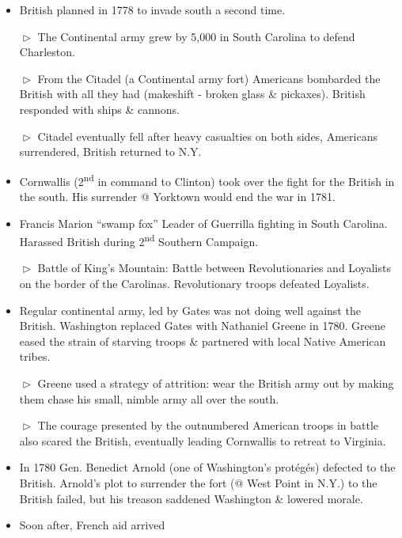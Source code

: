 \documentclass[10pt]{article}
\begin{document}
\begin{flushleft}

\begin{multicols}{2}

\begin{itemize}
\item British planned in 1778 to invade south a second time.
\item[$\vartriangleright$] The Continental army grew by 5,000 in South Carolina to defend Charleston.
\item[$\vartriangleright$] From the Citadel (a Continental army fort) Americans bombarded the British with all they had (makeshift - broken glass \& pickaxes). British responded with ships \& cannons.
\item[$\vartriangleright$] Citadel eventually fell after heavy casualties on both sides, Americans surrendered, British returned to N.Y.
\item Cornwallis (2\textsuperscript{nd} in command to Clinton) took over the fight for the British in the south. His surrender @ Yorktown would end the war in 1781.
\item Francis Marion ``swamp fox'' Leader of Guerrilla fighting in South Carolina. Harassed British during 2\textsuperscript{nd} Southern Campaign. 
\item[$\vartriangleright$] Battle of King's Mountain: Battle between Revolutionaries and Loyalists on the border of the Carolinas. Revolutionary troops defeated Loyalists.
\item Regular continental army, led by Gates was not doing well against the British. Washington replaced Gates with Nathaniel Greene in 1780. Greene eased the strain of starving troops \& partnered with local Native American tribes. 
\item[$\vartriangleright$] Greene used a strategy of attrition: wear the British army out by making them chase his small, nimble army all over the south.
\item[$\vartriangleright$] The courage presented by the outnumbered American troops in battle also scared the British, eventually leading Cornwallis to retreat to Virginia.
\item In 1780 Gen. Benedict Arnold (one of Washington's prot\'eg\'es) defected to the British. Arnold's plot to surrender the fort (@ West Point in N.Y.) to the British failed, but his treason saddened Washington \& lowered morale.
\item Soon after, French aid arrived

\end{itemize}
\end{multicols}
\end{flushleft}
\end{document}
